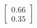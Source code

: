 \documentclass[preview]{standalone}
\begin{document}
\begin{align*}
\begin{bmatrix} 0.66 \\ 0.35 \end{bmatrix}
\end{align*}
\end{document}
